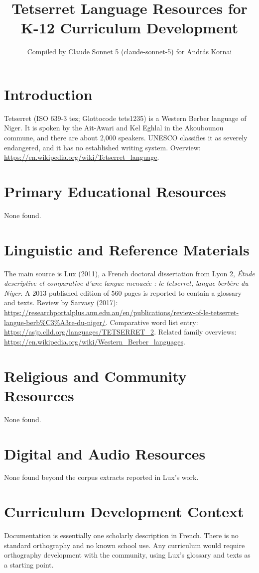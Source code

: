 \documentclass[12pt]{article}
\title{Tetserret Language Resources for K-12 Curriculum Development}
\author{Compiled by Claude Sonnet 5 (claude-sonnet-5) for Andr\'as Kornai}
\date{}
\begin{document}
\maketitle

\section{Introduction}
Tetserret (ISO 639-3 tez; Glottocode tets1235) is a Western Berber language of Niger. It is spoken by the Ait-Awari and Kel Eghlal in the Akoubounou commune, and there are about 2,000 speakers. UNESCO classifies it as severely endangered, and it has no established writing system. Overview: \url{https://en.wikipedia.org/wiki/Tetserret_language}.

\section{Primary Educational Resources}
None found.

\section{Linguistic and Reference Materials}
The main source is Lux (2011), a French doctoral dissertation from Lyon 2, \emph{\'Etude descriptive et comparative d'une langue menac\'ee : le tetserret, langue berb\`ere du Niger}. A 2013 published edition of 560 pages is reported to contain a glossary and texts. Review by Sarvasy (2017): \url{https://researchportalplus.anu.edu.au/en/publications/review-of-le-tetserret-langue-berb\%C3\%A3re-du-niger/}.
Comparative word list entry: \url{https://asjp.clld.org/languages/TETSERRET_2}.
Related family overviews: \url{https://en.wikipedia.org/wiki/Western_Berber_languages}.

\section{Religious and Community Resources}
None found.

\section{Digital and Audio Resources}
None found beyond the corpus extracts reported in Lux's work.

\section{Curriculum Development Context}
Documentation is essentially one scholarly description in French. There is no standard orthography and no known school use. Any curriculum would require orthography development with the community, using Lux's glossary and texts as a starting point.
\end{document}
